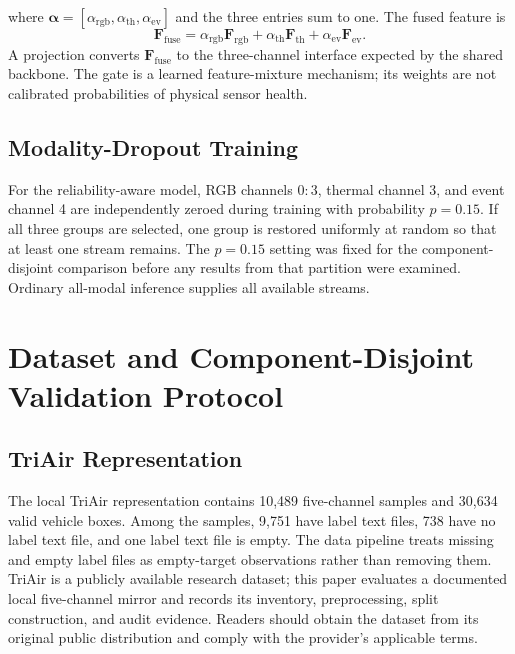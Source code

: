 where $\boldsymbol{\alpha}=[\alpha_{\mathrm{rgb}},\alpha_{\mathrm{th}},\alpha_{\mathrm{ev}}]$ and the three entries sum to one. The fused feature is
\begin{equation}
\mathbf{F}_{\mathrm{fuse}}=\alpha_{\mathrm{rgb}}\mathbf{F}_{\mathrm{rgb}}+\alpha_{\mathrm{th}}\mathbf{F}_{\mathrm{th}}+\alpha_{\mathrm{ev}}\mathbf{F}_{\mathrm{ev}}.
\end{equation}
A projection converts $\mathbf{F}_{\mathrm{fuse}}$ to the three-channel interface expected by the shared backbone. The gate is a learned feature-mixture mechanism; its weights are not calibrated probabilities of physical sensor health.

\subsection{Modality-Dropout Training}
For the reliability-aware model, RGB channels $0{:}3$, thermal channel 3, and event channel 4 are independently zeroed during training with probability $p=0.15$. If all three groups are selected, one group is restored uniformly at random so that at least one stream remains. The $p=0.15$ setting was fixed for the component-disjoint comparison before any results from that partition were examined. Ordinary all-modal inference supplies all available streams.

\section{Dataset and Component-Disjoint Validation Protocol}
\subsection{TriAir Representation}
The local TriAir representation contains 10,489 five-channel samples and 30,634 valid vehicle boxes. Among the samples, 9,751 have label text files, 738 have no label text file, and one label text file is empty. The data pipeline treats missing and empty label files as empty-target observations rather than removing them. TriAir is a publicly available research dataset; this paper evaluates a documented local five-channel mirror and records its inventory, preprocessing, split construction, and audit evidence. Readers should obtain the dataset from its original public distribution and comply with the provider's applicable terms.

